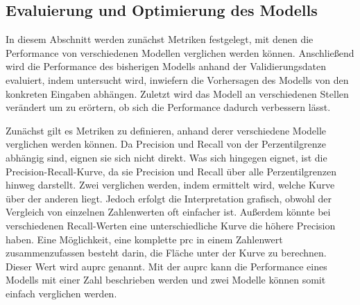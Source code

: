 \subsection{Evaluierung und Optimierung des Modells}
\label{sec:EvaluierungOptimierung}
In diesem Abschnitt werden zunächst Metriken festgelegt, mit denen die Performance von verschiedenen Modellen verglichen werden können.
Anschließend wird die Performance des bisherigen Modells anhand der Validierungsdaten evaluiert, indem untersucht wird, inwiefern die Vorhersagen des Modells von den konkreten Eingaben abhängen.
Zuletzt wird das Modell an verschiedenen Stellen verändert um zu erörtern, ob sich die Performance dadurch verbessern lässt.

Zunächst gilt es Metriken zu definieren, anhand derer verschiedene Modelle verglichen werden können.
Da Precision und Recall von der Perzentilgrenze abhängig sind, eignen sie sich nicht direkt.
Was sich hingegen eignet, ist die Precision-Recall-Kurve, da sie Precision und Recall über alle Perzentilgrenzen hinweg darstellt.
Zwei  verglichen werden, indem ermittelt wird, welche Kurve über der anderen liegt.
Jedoch erfolgt die Interpretation grafisch, obwohl der Vergleich von einzelnen Zahlenwerten oft einfacher ist.
Außerdem könnte bei verschiedenen Recall-Werten eine unterschiedliche Kurve die höhere Precision haben.
Eine Möglichkeit, eine komplette \acrshort{prc} in einem Zahlenwert zusammenzufassen besteht darin, die Fläche unter der Kurve zu berechnen.
Dieser Wert wird \acrfull{auprc} genannt.
Mit der \acrshort{auprc} kann die Performance eines Modells mit einer Zahl beschrieben werden und zwei Modelle können somit einfach verglichen werden.
